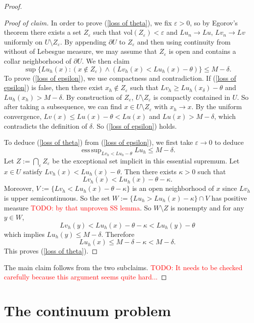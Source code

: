 \documentclass[reqno,11pt]{amsart}
\newcommand{\vol}{\mathrm{vol}}
\DeclareMathOperator*{\esssup}{ess\,sup}
\theoremstyle{definition}
\numberwithin{equation}{section}
\newcommand\todo[1]{\textcolor{red}{TODO: #1}}
\begin{document}
\begin{proof}
\begin{proof}[Proof of claim]
In order to prove (\ref{loss of theta}), we fix $\varepsilon > 0$, so by Egorov's theorem there exists a set $Z_\varepsilon$ such that $\vol(Z_\varepsilon) < \varepsilon$ and $Lu_n \to Lu$, $Lv_n \to Lv$ uniformly on $U \setminus Z_\varepsilon$.
By appending $\partial U$ to $Z_\varepsilon$ and then using continuity from without of Lebesgue measure, we may assume that $Z_\varepsilon$ is open and contains a collar neighborhood of $\partial U$.
We then claim 
\begin{equation}\label{loss of epsilon}
\sup \{Lu_h(x): (x \notin Z_\varepsilon) \wedge (Lv_h(x) < Lu_h(x) - \theta)\} \leq M - \delta.
\end{equation}
To prove (\ref{loss of epsilon}), we use compactness and contradiction.
If (\ref{loss of epsilon}) is false, then there exist $x_h \notin Z_\varepsilon$ such that $Lv_h \geq Lu_h(x_\delta) - \theta$ and $Lu_h(x_h) > M - \delta$.
By construction of $Z_\varepsilon$, $U \setminus Z_\varepsilon$ is compactly contained in $U$.
So after taking a subsequence, we can find $x \in U \setminus Z_\varepsilon$ with $x_h \to x$.
By the uniform convergence, $Lv(x) \leq Lu(x) - \theta < Lu(x)$ and $Lu(x) > M - \delta$, which contradicts the definition of $\delta$.
So (\ref{loss of epsilon}) holds.

To deduce (\ref{loss of theta}) from (\ref{loss of epsilon}), we first take $\varepsilon \to 0$ to deduce 
$$\esssup_{Lv_h < Lu_h - \theta} Lu_h \leq M - \delta.$$
Let $Z := \bigcap_\varepsilon Z_\varepsilon$ be the exceptional set implicit in this essential supremum.
Let $x \in U$ satisfy $Lv_h(x) < Lu_h(x) - \theta$.
Then there exists $\kappa > 0$ such that
$$Lv_h(x) < Lu_h(x) - \theta - \kappa.$$
Moreover, $V := \{Lv_h < Lu_h(x) - \theta - \kappa\}$ is an open neighborhood of $x$ since $Lv_h$ is upper semicontinuous.
So the set $W := \{Lu_h > Lu_h(x) - \kappa\} \cap V$ has positive measure \todo{by that unproven SS lemma}.
So $W \setminus Z$ is nonempty and for any $y \in W$,
$$Lv_h(y) < Lu_h(x) - \theta - \kappa < Lu_h(y) - \theta$$
which implies $Lu_h(y) \leq M - \delta$.
Therefore
$$Lu_h(x) \leq M - \delta - \kappa < M - \delta.$$
This proves (\ref{loss of theta}).
\end{proof}

The main claim follows from the two subclaims. \todo{It needs to be checked carefully because this argument seems quite hard...}
\end{proof}

\section{The continuum problem}
\end{document}
